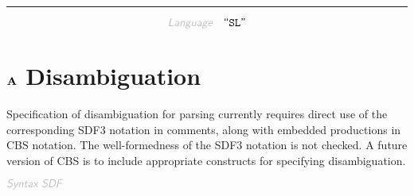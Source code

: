 

\begin{center}
\rule{3in}{0.4pt}
\end{center}

\begin{displaymath}
\KEY{Language} \quad \STRING{SL}
\end{displaymath}

\section{$\SECT{A}$ Disambiguation}\hypertarget{SectionNumber:A}{}\label{SectionNumber:A}

Specification of disambiguation for parsing currently requires direct use of
  the corresponding SDF3 notation in comments, along with embedded productions
  in CBS notation. The well-formedness of the SDF3 notation is not checked.
  A future version of CBS is to include appropriate constructs for specifying
  disambiguation.

$\KEY{Syntax SDF}$

